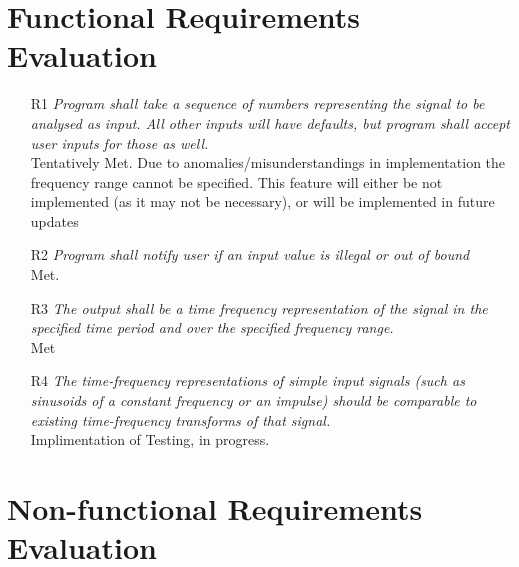 \documentclass[12pt, titlepage]{article}
\begin{document}
\section{Functional Requirements Evaluation}
\begin{itemize}

\item[R1] \emph{Program shall take a sequence of numbers representing the signal to be analysed as input. All other inputs will have defaults, but program shall accept user inputs for those as well.}
\\
Tentatively Met. Due to anomalies/misunderstandings in implementation the frequency range cannot be specified. This feature will either be not implemented (as it may not be necessary), or will be implemented in future updates

\item[R2] \emph{Program shall notify user if an input value is illegal or out of bound}
\\
Met.

  
\item[R3] \emph{The output shall be a time frequency representation of the signal in the specified time period and over the specified frequency range.}\\
Met

\item[R4] \emph{The time-frequency representations of simple input signals (such as sinusoids of a constant frequency or an impulse) should be comparable to existing time-frequency transforms of that signal.}\\
Implimentation of Testing, in progress. 

\end{itemize}
\section{Non-functional Requirements Evaluation}
\end{document}
